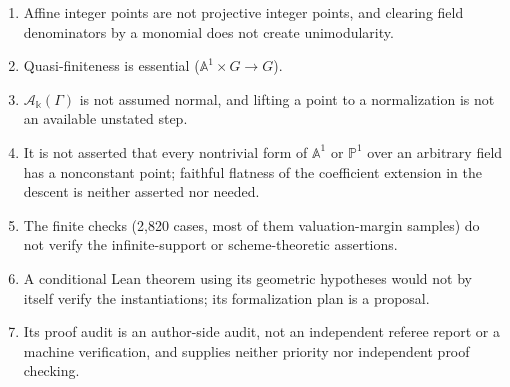 \documentclass[11pt,oneside]{article}
\numberwithin{equation}{section}
\theoremstyle{definition}
\theoremstyle{remark}
\newcommand{\No}{\mathbf{No}}
\newcommand{\crA}{\mathcal A_\Bbbk(\Gamma)}
\newcommand{\Aff}{\mathbb A}
\begin{document}
\begin{enumerate}[leftmargin=*,itemsep=1pt]
$\No[i]$, where elliptic curves have nonconstant points; field solvability and
integer-part solvability are different problems.
\item Affine integer points are not projective integer points, and clearing field
denominators by a monomial does not create unimodularity.
\item Quasi-finiteness is essential ($\Aff^1\times G\to G$).
\item $\crA$ is not assumed normal, and lifting a point to a normalization is not an
available unstated step.
\item It is not asserted that every nontrivial form of $\Aff^1$ or $\mathbb P^1$ over an
arbitrary field has a nonconstant point; faithful flatness of the coefficient extension
in the descent is neither asserted nor needed.
\item The finite checks (2,820 cases, most of them valuation-margin samples) do not verify
the infinite-support or scheme-theoretic assertions.
\item A conditional Lean theorem using its geometric hypotheses would not by itself verify
the instantiations; its formalization plan is a proposal.
\item Its proof audit is an author-side audit, not an independent referee report or a
machine verification, and supplies neither priority nor independent proof checking.
\end{enumerate}
\end{document}
